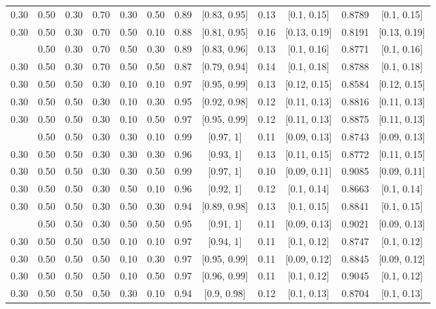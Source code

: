 \documentclass[
  11pt,
]{article}
\begin{document}
\begin{landscape}
\begin{ThreePartTable}
\begin{longtable}[t]{cccccccccccc}
0.30 & 0.50 & 0.30 & 0.70 & 0.30 & 0.50 & 0.89 & {}[0.83, 0.95] & 0.13 & {}[0.1, 0.15] & 0.8789 & {}[0.1, 0.15]\\
0.30 & 0.50 & 0.30 & 0.70 & 0.50 & 0.10 & 0.88 & {}[0.81, 0.95] & 0.16 & {}[0.13, 0.19] & 0.8191 & {}[0.13, 0.19]\\
\addlinespace
0.30 & 0.50 & 0.30 & 0.70 & 0.50 & 0.30 & 0.89 & {}[0.83, 0.96] & 0.13 & {}[0.1, 0.16] & 0.8771 & {}[0.1, 0.16]\\
0.30 & 0.50 & 0.30 & 0.70 & 0.50 & 0.50 & 0.87 & {}[0.79, 0.94] & 0.14 & {}[0.1, 0.18] & 0.8788 & {}[0.1, 0.18]\\
0.30 & 0.50 & 0.50 & 0.30 & 0.10 & 0.10 & 0.97 & {}[0.95, 0.99] & 0.13 & {}[0.12, 0.15] & 0.8584 & {}[0.12, 0.15]\\
0.30 & 0.50 & 0.50 & 0.30 & 0.10 & 0.30 & 0.95 & {}[0.92, 0.98] & 0.12 & {}[0.11, 0.13] & 0.8816 & {}[0.11, 0.13]\\
0.30 & 0.50 & 0.50 & 0.30 & 0.10 & 0.50 & 0.97 & {}[0.95, 0.99] & 0.12 & {}[0.11, 0.13] & 0.8875 & {}[0.11, 0.13]\\
\addlinespace
0.30 & 0.50 & 0.50 & 0.30 & 0.30 & 0.10 & 0.99 & {}[0.97, 1] & 0.11 & {}[0.09, 0.13] & 0.8743 & {}[0.09, 0.13]\\
0.30 & 0.50 & 0.50 & 0.30 & 0.30 & 0.30 & 0.96 & {}[0.93, 1] & 0.13 & {}[0.11, 0.15] & 0.8772 & {}[0.11, 0.15]\\
0.30 & 0.50 & 0.50 & 0.30 & 0.30 & 0.50 & 0.99 & {}[0.97, 1] & 0.10 & {}[0.09, 0.11] & 0.9085 & {}[0.09, 0.11]\\
0.30 & 0.50 & 0.50 & 0.30 & 0.50 & 0.10 & 0.96 & {}[0.92, 1] & 0.12 & {}[0.1, 0.14] & 0.8663 & {}[0.1, 0.14]\\
0.30 & 0.50 & 0.50 & 0.30 & 0.50 & 0.30 & 0.94 & {}[0.89, 0.98] & 0.13 & {}[0.1, 0.15] & 0.8841 & {}[0.1, 0.15]\\
\addlinespace
0.30 & 0.50 & 0.50 & 0.30 & 0.50 & 0.50 & 0.95 & {}[0.91, 1] & 0.11 & {}[0.09, 0.13] & 0.9021 & {}[0.09, 0.13]\\
0.30 & 0.50 & 0.50 & 0.50 & 0.10 & 0.10 & 0.97 & {}[0.94, 1] & 0.11 & {}[0.1, 0.12] & 0.8747 & {}[0.1, 0.12]\\
0.30 & 0.50 & 0.50 & 0.50 & 0.10 & 0.30 & 0.97 & {}[0.95, 0.99] & 0.11 & {}[0.09, 0.12] & 0.8845 & {}[0.09, 0.12]\\
0.30 & 0.50 & 0.50 & 0.50 & 0.10 & 0.50 & 0.97 & {}[0.96, 0.99] & 0.11 & {}[0.1, 0.12] & 0.9045 & {}[0.1, 0.12]\\
0.30 & 0.50 & 0.50 & 0.50 & 0.30 & 0.10 & 0.94 & {}[0.9, 0.98] & 0.12 & {}[0.1, 0.13] & 0.8704 & {}[0.1, 0.13]\\

\end{longtable}
\end{ThreePartTable}
\end{landscape}
\end{document}

